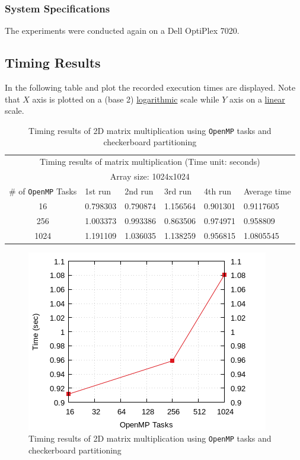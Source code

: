 \documentclass{article}
\begin{document}
\subsubsection{System Specifications}
The experiments were conducted again on a Dell OptiPlex 7020.

\subsection{Timing Results}
In the following table and plot the recorded execution times are displayed.
Note that $X$ axis is plotted on a (base 2) \underline{logarithmic} scale while
$Y$ axis on a \underline{linear} scale.

\begin{table}[htbp]
  \centering
    \begin{tabular}{|c||l|l|l|l||l|} 
    \hline
    \multicolumn{6}{|c|}{Timing results of matrix multiplication (Time unit: seconds)} \\
    \multicolumn{6}{|c|}{Array size: 1024x1024} \\
    \hline
   \# of \texttt{OpenMP} Tasks & 1st run & 2nd run & 3rd run & 4th run & Average time\\ [0.5ex] 
    \hline\hline
    16 & 0.798303 & 0.790874 & 1.156564 & 0.901301 & 0.9117605 \\ 
    \hline
    256 & 1.003373 & 0.993386 & 0.863506 & 0.974971 & 0.958809 \\
    \hline
    1024 & 1.191109 & 1.036035 & 1.138259 & 0.956815 & 1.0805545 \\ [1ex]
    \hline
    \end{tabular}
  \caption{Timing results of 2D matrix multiplication using \texttt{OpenMP}
           tasks and checkerboard partitioning}
\end{table}


\begin{figure}[htbp]
  \centering
  \includegraphics[width=0.55\columnwidth]{../ex3/plots/matmul.png}
  \caption{Timing results of 2D matrix multiplication using \texttt{OpenMP}
           tasks and checkerboard partitioning}
\end{figure}
\end{document}
